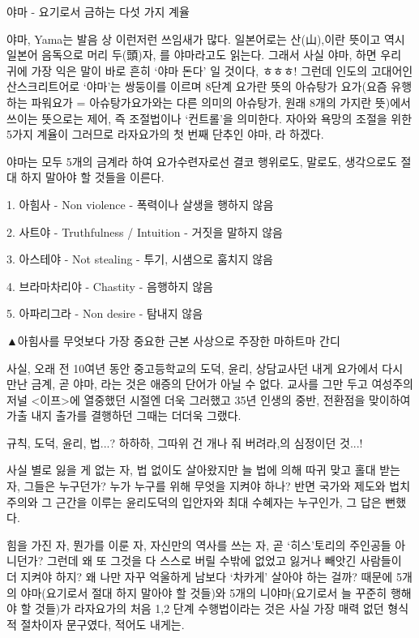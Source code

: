 \documentclass[12pt, a4paper, oneside]{book}
\begin{document}
야마 - 요기로서 금하는 다섯 가지 계율




야마, Yama는 발음 상 이런저런 쓰임새가 많다. 일본어로는 산(山),이란 뜻이고 역시 일본어 음독으로 머리 두(頭)자, 를 야마라고도 읽는다. 그래서 사실 야마, 하면 우리 귀에 가장 익은 말이 바로 흔히 ‘야마 돈다’ 일 것이다, ㅎㅎㅎ! 그런데 인도의 고대어인 산스크리트어로 ‘야마’는 쌍둥이를 이르며 8단계 요가란 뜻의 아슈탕가 요가(요즘 유행하는 파워요가 = 아슈탕가요가와는 다른 의미의 아슈탕가, 원래 8개의 가지란 뜻)에서 쓰이는 뜻으로는 제어, 즉 조절법이나 ‘컨트롤’을 의미한다. 자아와 욕망의 조절을 위한 5가지 계율이 그러므로 라자요가의 첫 번째 단추인 야마, 라 하겠다.




야마는 모두 5개의 금계라 하여 요가수련자로선 결코 행위로도, 말로도, 생각으로도 절대 하지 말아야 할 것들을 이른다.




1. 아힘사 - Non violence  - 폭력이나 살생을 행하지 않음

2. 사트야 - Truthfulness / Intuition   - 거짓을 말하지 않음 

3. 아스테야 - Not stealing - 투기, 시샘으로 훔치지 않음

4. 브라마차리야 - Chastity - 음행하지 않음

5. 아파리그라 - Non desire - 탐내지 않음 






▲아힘사를 무엇보다 가장 중요한 근본 사상으로 주장한 마하트마 간디





사실, 오래 전 10여년 동안 중고등학교의 도덕, 윤리, 상담교사던 내게 요가에서 다시 만난 금계, 곧 야마, 라는 것은 애증의 단어가 아닐 수 없다. 교사를 그만 두고 여성주의 저널 <이프>에 열중했던 시절엔 더욱 그러했고 35년 인생의 중반, 전환점을 맞이하여 가출 내지 출가를 결행하던 그때는 더더욱 그랬다.


규칙, 도덕, 윤리, 법...? 하하하, 그따위 건 개나 줘 버려라,의 심정이던 것...!




사실 별로 잃을 게 없는 자, 법 없이도 살아왔지만 늘 법에 의해 따귀 맞고 홀대 받는 자, 그들은 누구던가? 누가 누구를 위해 무엇을 지켜야 하나? 반면 국가와 제도와 법치주의와 그 근간을 이루는 윤리도덕의 입안자와 최대 수혜자는 누구인가, 그 답은 뻔했다.

힘을 가진 자, 뭔가를 이룬 자, 자신만의 역사를 쓰는 자, 곧 ‘히스’토리의 주인공들 아니던가? 그런데 왜 또 그것을 다 스스로 버릴 수밖에 없었고 잃거나 빼앗긴 사람들이 더 지켜야 하지? 왜 나만 자꾸 억울하게 남보다 ‘차카게’ 살아야 하는 걸까? 때문에 5개의 야마(요기로서 절대 하지 말아야 할 것들)와 5개의 니야마(요기로서 늘 꾸준히 행해야 할 것들)가 라자요가의 처음 1,2 단계 수행법이라는 것은 사실 가장 매력 없던 형식적 절차이자 문구였다, 적어도 내게는.
\end{document}
